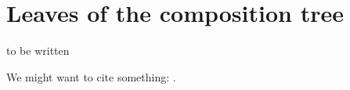 
\chapter{Leaves of the composition tree}

to be written

We might want to cite something: \cite[(51.7)]{CR0}.
